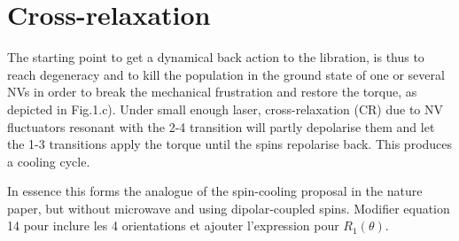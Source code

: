 \documentclass[preprintnumbers,amsmath,amssymb]{revtex4}
\begin{document}
\section{Cross-relaxation}

The starting point to get a dynamical back action to the libration, is thus to reach degeneracy and to kill the population in the ground state of one or several NVs in order to break the mechanical frustration and restore the torque, as depicted in Fig.1.c). 
Under small enough laser, cross-relaxation (CR) due to NV fluctuators resonant with the 2-4 transition will partly depolarise them and let the 1-3 transitions apply the torque until the spins repolarise back. This produces a cooling cycle.  

In essence this forms the analogue of the spin-cooling proposal in the nature paper, but without microwave and using dipolar-coupled spins.
Modifier equation 14 pour inclure les 4 orientations et ajouter l'expression pour $R_1(\theta)$.


%
%
%
%
%
%
%
%
%
\end{document}
